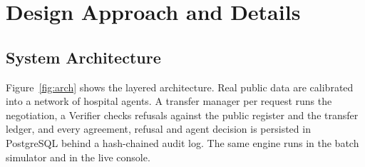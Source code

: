 \section{Design Approach and Details}
\label{sec:design}

\subsection{System Architecture}
Figure~\ref{fig:arch} shows the layered architecture. Real public data are calibrated into a network of hospital agents. A transfer manager per request runs the negotiation, a Verifier checks refusals against the public register and the transfer ledger, and every agreement, refusal and agent decision is persisted in PostgreSQL behind a hash-chained audit log. The same engine runs in the batch simulator and in the live console.

